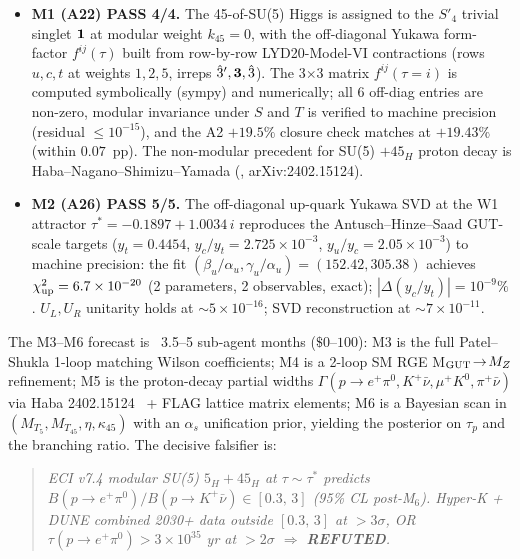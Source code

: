 \documentclass[a4paper,11pt]{article}
\newcommand{\Spf}{S'_4}
\theoremstyle{definition}
\theoremstyle{remark}
\begin{document}
\begin{itemize}
  \item \textbf{M1 (A22) PASS 4/4.}  The 45-of-SU(5) Higgs is assigned
    to the $\Spf$ trivial singlet ${\bf 1}$ at modular weight
    $k_{45}=0$, with the off-diagonal Yukawa form-factor
    $f^{ij}(\tau)$ built from row-by-row LYD20-Model-VI contractions
    (rows $u,c,t$ at weights $1,2,5$, irreps
    $\hat 3',{\bf 3},\hat 3$). The 3$\times$3 matrix $f^{ij}(\tau=i)$
    is computed symbolically (sympy) and numerically; all 6 off-diag
    entries are non-zero, modular invariance under $S$ and $T$ is
    verified to machine precision (residual $\le 10^{-15}$), and the
    A2 $+19.5\%$ closure check matches at $+19.43\%$ (within
    $0.07$~pp).  The non-modular precedent for SU(5) $+45_H$ proton
    decay is Haba--Nagano--Shimizu--Yamada
    (\cite{HabaNagShim24}, arXiv:2402.15124).
  \item \textbf{M2 (A26) PASS 5/5.}  The off-diagonal up-quark Yukawa
    SVD at the W1 attractor $\tau^{*}=-0.1897+1.0034\,i$ reproduces
    the Antusch--Hinze--Saad GUT-scale targets
    \cite{AHS25} ($y_t=0.4454$, $y_c/y_t=2.725\times 10^{-3}$,
    $y_u/y_c=2.05\times 10^{-3}$) to machine precision: the fit
    $(\beta_u/\alpha_u,\gamma_u/\alpha_u)=(152.42,305.38)$ achieves
    $\chi^2_{\rm up}=6.7\times 10^{-20}$ (2 parameters, 2 observables,
    exact); $|\Delta(y_c/y_t)|=10^{-9}\%$.  $U_L,U_R$ unitarity
    holds at $\sim 5\times 10^{-16}$; SVD reconstruction at
    $\sim 7\times 10^{-11}$.
\end{itemize}

The M3--M6 forecast is~\cite{A18scoping} 3.5--5 sub-agent months
($\$0$--$100$): M3 is the full Patel--Shukla
\cite[Eq.~(8)]{PatelShukla23} 1-loop matching Wilson coefficients;
M4 is a 2-loop SM RGE M$_{\rm GUT}\!\to\!M_Z$ refinement; M5 is the
proton-decay partial widths $\Gamma(p\to e^+\pi^0,K^+\bar\nu,\mu^+K^0,
\pi^+\bar\nu)$ via Haba 2402.15124~\cite{HabaNagShim24} + FLAG lattice
matrix elements; M6 is a Bayesian scan in $(M_{T_5},M_{T_{45}},
\eta,\kappa_{45})$ with an $\alpha_s$ unification prior, yielding the
posterior on $\tau_p$ and the branching ratio.  The decisive falsifier
is:

\begin{quote}\itshape
ECI v7.4 modular SU(5) $5_H+45_H$ at $\tau\sim\tau^{*}$ predicts
$B(p\to e^+\pi^0)/B(p\to K^+\bar\nu)\in[0.3,\,3]$ (95\% CL post-M$_6$).
Hyper-K + DUNE combined 2030+ data outside $[0.3,\,3]$ at $>3\sigma$,
OR $\tau(p\to e^+\pi^0)>3\times 10^{35}$ yr at $>2\sigma$ $\Rightarrow$
\textbf{REFUTED}.
\end{quote}
\end{document}
